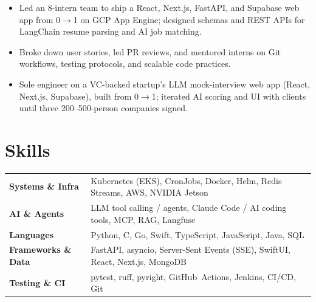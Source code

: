 \documentclass[11pt, letterpaper]{article}
\begin{document}
\vspace{0.5pt}
\begin{itemize}
  \item Led an 8-intern team to ship a React, Next.js, FastAPI, and Supabase web app from 0$\to$1 on GCP App Engine; designed schemas and REST APIs for LangChain resume parsing and AI job matching.
  \item Broke down user stories, led PR reviews, and mentored interns on Git workflows, testing protocols, and scalable code practices.
\end{itemize}

\vspace{0.5pt}
\begin{itemize}
  \item Sole engineer on a VC-backed startup's LLM mock-interview web app (React, Next.js, Supabase), built from 0$\to$1; iterated AI scoring and UI with clients until three 200--500-person companies signed.
\end{itemize}

\section{Skills}
\begin{tabularx}{\textwidth}{@{}l @{\hspace{7pt}} >{\raggedright\arraybackslash}X@{}}
  \textbf{Systems \& Infra} & Kubernetes (EKS), CronJobs, Docker, Helm, Redis Streams, AWS, NVIDIA Jetson \\[1pt]
  \textbf{AI \& Agents} & LLM tool calling / agents, Claude Code / AI coding tools, MCP, RAG, Langfuse \\[1pt]
  \textbf{Languages} & Python, C, Go, Swift, TypeScript, JavaScript, Java, SQL \\[1pt]
  \textbf{Frameworks \& Data} & FastAPI, asyncio, Server-Sent Events (SSE), SwiftUI, React, Next.js, MongoDB \\[1pt]
  \textbf{Testing \& CI} & pytest, ruff, pyright, GitHub~Actions, Jenkins, CI/CD, Git \\
\end{tabularx}
\end{document}
